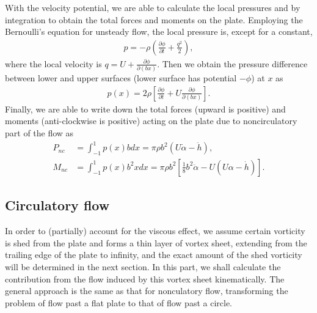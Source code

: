 With the velocity potential, we are able to calculate the local pressures and by integration to obtain the total forces and moments on the plate.
Employing the Bernoulli's equation for unsteady flow, the local pressure is, except for a constant,
\begin{align}
p = -\rho (\frac{\partial \phi}{\partial t} + \frac{q^2}{2}),
\end{align} 
where the local velocity is $q = U + \frac{\partial \phi}{\partial (bx)}$.
Then we obtain the pressure difference between lower and upper surfaces (lower surface has potential $-\phi$) at $x$ as
\begin{align}
p(x) = 2 \rho [\frac{\partial \phi}{\partial t} + U\frac{\partial \phi}{\partial (bx)}].
\end{align} 
Finally, we are able to write down the total forces (upward is positive) and moments (anti-clockwise is positive) acting on the plate due to noncirculatory part of the flow as
\begin{align}
P_{nc} & = \int^{1}_{-1} p(x)bdx
   = \pi\rho b^2(U\dot{\alpha} - \ddot{h}),   \\
M_{nc} & = \int^{1}_{-1} p(x)b^2xdx
   = \pi\rho b^2[\frac{1}{8}b^2\ddot{\alpha} - U(U\alpha - \dot{h})].
\end{align}


\subsection{Circulatory flow}

In order to (partially) account for the viscous effect, we assume certain vorticity is shed from the plate and forms a thin layer of vortex sheet, extending from the trailing edge of the plate to infinity, and the exact amount of the shed vorticity will be determined in the next section.
In this part, we shall calculate the contribution from the flow induced by this vortex sheet kinematically.
The general approach is the same as that for nonculatory flow, transforming the problem of flow past a flat plate to that of flow past a circle.

